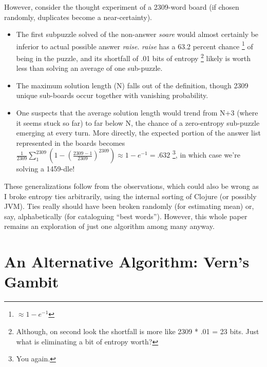 \documentclass[11pt, oneside]{article} 	%
\begin{document}
However, consider the thought experiment of a 2309-word board (if chosen randomly, duplicates become a near-certainty).
\begin{itemize}
\item The first subpuzzle solved of the non-answer \emph{soare} would almost certainly be inferior to actual possible answer \emph{raise}. \emph{raise} has a 63.2 percent chance \footnote{$\approx 1- e^{-1}$} of being in the puzzle, and its shortfall of .01 bits of entropy \footnote{Although, on second look the shortfall is more like 2309 * .01 = 23 bits. Just what is eliminating a bit of entropy worth?} likely is worth less than solving an average of one sub-puzzle.
\item The maximum solution length (N) falls out of the definition, though 2309 unique sub-boards occur together with vanishing probability.
\item One suspects that the average solution length would trend from N+3 (where it seems stuck so far) to far below N, the chance of a zero-entropy sub-puzzle emerging at every turn. More directly, the expected portion of the answer list represented in the boards becomes $\frac{1}{2309} \sum_1^{2309} (1 - (\frac{2309 - 1}{2309})^{2309}) \approx 1 - e^{-1} = .632$ \footnote {You again.}, in which case we're solving a 1459-dle!
\end{itemize}

These generalizations follow from the observations, which could also be wrong as I broke entropy ties arbitrarily, using the internal sorting of Clojure (or possibly JVM). Ties really should have been broken randomly (for estimating mean) or, say, alphabetically (for cataloguing ``best words''). However, this whole paper remains an exploration of just one algorithm among many anyway.

\section{An Alternative Algorithm: Vern's Gambit}
\end{document}
